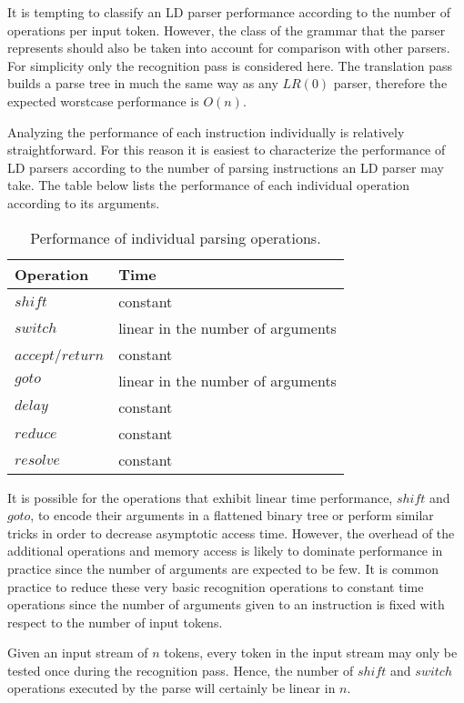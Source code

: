 \documentclass[envcountsame,runningheads]{llncs}
\begin{document}
It is tempting to classify an LD parser performance according to the number of operations per input token.
However, the class of the grammar that the parser represents should also be taken into account for comparison with other parsers.
For simplicity only the recognition pass is considered here. 
The translation pass builds a parse tree in much the same way as any $LR(0)$ parser, therefore the expected worstcase performance is $O(n)$.

Analyzing the performance of each instruction individually is relatively straightforward. 
For this reason it is easiest to characterize the performance of LD parsers according to the number of parsing instructions an LD parser may take.
The table below lists the performance of each individual operation according to its arguments.
\clearpage
\begin{table}[!ht]\centering
  \begin{tabular}{|l|l|}
  \hline
  \textbf{Operation} & \textbf{Time} \\
  \hline
  $shi\!ft$          & constant \\ \hline
  $switch$           & linear in the number of arguments \\ \hline
  $accept$/$return$  & constant \\ \hline
  $goto$             & linear in the number of arguments \\ \hline
  $delay$            & constant \\ \hline
  $reduce$           & constant \\ \hline
  $resolve$          & constant \\
  \hline
  \end{tabular}
\caption{Performance of individual parsing operations.}
\end{table}

It is possible for the operations that exhibit linear time performance, $shi\!ft$ and $goto$, to encode their arguments in a flattened binary tree or perform similar tricks in order to decrease asymptotic access time.
However, the overhead of the additional operations and memory access is likely to dominate performance in practice since the number of arguments are expected to be few.
It is common practice to reduce these very basic recognition operations to constant time operations since the number of arguments given to an instruction is fixed with respect to the number of input tokens.

Given an input stream of $n$ tokens, every token in the input stream may only be tested once during the recognition pass.
Hence, the number of $shi\!ft$ and $switch$ operations executed by the parse will certainly be linear in $n$.
\end{document}
